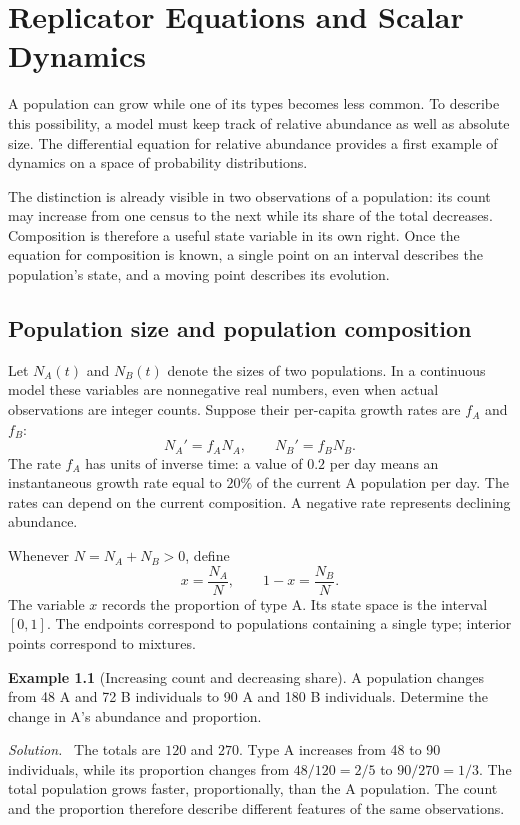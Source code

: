 \documentclass[11pt,oneside,openany]{book}
\theoremstyle{definition}
\newtheorem{example}{Example}[chapter]
\theoremstyle{remark}
\newenvironment{solution}{\par\smallskip\noindent\textit{Solution.}\ }{\par\smallskip}
\numberwithin{equation}{chapter}
\begin{document}
\mainmatter
\setcounter{chapter}{0}
\chapter{Replicator Equations and Scalar Dynamics}
\label{ch:scalar}

A population can grow while one of its types becomes less common. To describe this possibility, a model must keep track of relative abundance as well as absolute size. The differential equation for relative abundance provides a first example of dynamics on a space of probability distributions.

The distinction is already visible in two observations of a population: its count may increase from one census to the next while its share of the total decreases. Composition is therefore a useful state variable in its own right. Once the equation for composition is known, a single point on an interval describes the population's state, and a moving point describes its evolution.

\section{Population size and population composition}
Let $N_A(t)$ and $N_B(t)$ denote the sizes of two populations. In a continuous model these variables are nonnegative real numbers, even when actual observations are integer counts. Suppose their per-capita growth rates are $f_A$ and $f_B$:
\begin{equation}\label{eq:populations}
N_A'=f_A N_A,\qquad N_B'=f_B N_B.
\end{equation}
The rate $f_A$ has units of inverse time: a value of $0.2$ per day means an instantaneous growth rate equal to $20\%$ of the current A population per day. The rates can depend on the current composition. A negative rate represents declining abundance.

Whenever $N=N_A+N_B>0$, define
\[
x=\frac{N_A}{N},\qquad 1-x=\frac{N_B}{N}.
\]
The variable $x$ records the proportion of type A. Its state space is the interval $[0,1]$. The endpoints correspond to populations containing a single type; interior points correspond to mixtures.

\begin{example}[Increasing count and decreasing share]
A population changes from 48 A and 72 B individuals to 90 A and 180 B individuals. Determine the change in A's abundance and proportion.
\begin{solution}
The totals are $120$ and $270$. Type A increases from 48 to 90 individuals, while its proportion changes from $48/120=2/5$ to $90/270=1/3$. The total population grows faster, proportionally, than the A population. The count and the proportion therefore describe different features of the same observations.
\end{solution}
\end{example}
\end{document}
